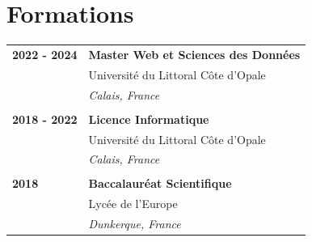 \documentclass[a4paper, 12pt]{article}
\begin{document}
\begin{minipage}[t]{0.65\textwidth}
	\section*{\textcolor{sectioncolor}{Formations}}
	\begin{tabular}{ m{} m{} }
		\textbf{2022 - 2024} & \textbf{Master Web et Sciences des Données} \\
		                     & Université du Littoral Côte d'Opale         \\
		                     & \textit{Calais, France}                     \\
		                     &                                             \\
		\textbf{2018 - 2022} & \textbf{Licence Informatique}               \\
		                     & Université du Littoral Côte d'Opale         \\
		                     & \textit{Calais, France}                     \\
		                     &                                             \\
		\textbf{2018}        & \textbf{Baccalauréat Scientifique}          \\
		                     & Lycée de l'Europe                           \\
		                     & \textit{Dunkerque, France}                  \\
	\end{tabular}

	\vspace{-0.4cm}


\end{minipage}
\end{document}
